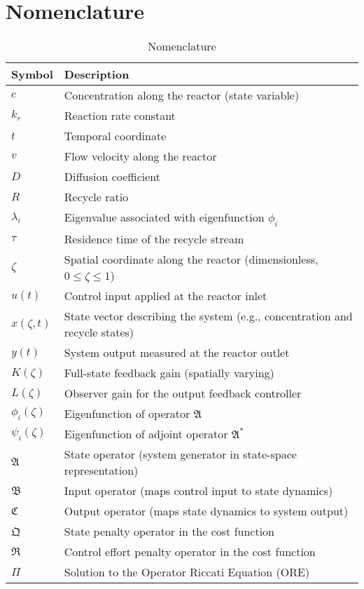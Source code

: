 \section*{Nomenclature}

\begin{table}[ht]
\centering
\caption{Nomenclature}
\begin{tabular}{ll}
\toprule
\textbf{Symbol} & \textbf{Description} \\
\midrule
$c$ & Concentration along the reactor (state variable) \\
$k_r$ & Reaction rate constant \\
$t$ & Temporal coordinate \\
$v$ & Flow velocity along the reactor \\
$D$ & Diffusion coefficient \\
$R$ & Recycle ratio \\
$\lambda_i$ & Eigenvalue associated with eigenfunction $\phi_i$ \\
$\tau$ & Residence time of the recycle stream \\
$\zeta$ & Spatial coordinate along the reactor (dimensionless, $0 \leq \zeta \leq 1$) \\

$u(t)$ & Control input applied at the reactor inlet \\
$x(\zeta, t)$ & State vector describing the system (e.g., concentration and recycle states) \\
$y(t)$ & System output measured at the reactor outlet \\
$K(\zeta)$ & Full-state feedback gain (spatially varying) \\
$L(\zeta)$ & Observer gain for the output feedback controller \\
$\phi_i(\zeta)$ & Eigenfunction of operator $\mathfrak{A}$ \\
$\psi_i(\zeta)$ & Eigenfunction of adjoint operator $\mathfrak{A}^*$ \\

$\mathfrak{A}$ & State operator (system generator in state-space representation) \\
$\mathfrak{B}$ & Input operator (maps control input to state dynamics) \\
$\mathfrak{C}$ & Output operator (maps state dynamics to system output) \\
$\mathfrak{Q}$ & State penalty operator in the cost function \\
$\mathfrak{R}$ & Control effort penalty operator in the cost function \\
$\Pi$ & Solution to the Operator Riccati Equation (ORE) \\
\bottomrule
\end{tabular}
\label{tab:nomenclature}
\end{table}


